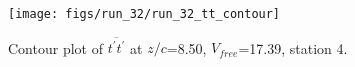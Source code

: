 \begin{figure}[H]
\centering
\texttt{[image: figs/run\_32/run\_32\_tt\_contour]}
\caption{Contour plot of $\overline{t^\prime t^\prime}$ at $z/c$=8.50, $V_{free}$=17.39, station 4.}
\label{fig:run_32_tt_contour}
\end{figure}


